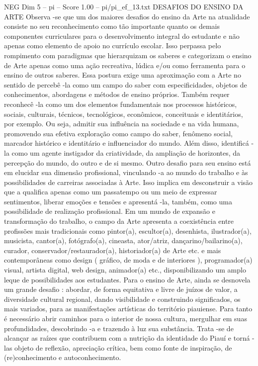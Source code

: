 \begin{textsample}{NEG Dim 5 – pi – Score 1.00 – pi/pi\_ef\_13.txt}  \label{ex:f5_neg_060}
DESAFIOS DO ENSINO DA ARTE Observa -se que um dos maiores desafios do ensino da Arte na atualidade consiste no seu reconhecimento como tão importante quanto os demais componentes curriculares para o desenvolvimento integral do estudante e não apenas como elemento de apoio no currículo escolar.
Isso perpassa pelo rompimento com paradigmas que hierarquizam os saberes e categorizam o ensino de Arte apenas como uma ação recreativa, lúdica e/ou como ferramenta para o ensino de outros saberes.
Essa postura exige uma aproximação com a Arte no sentido de percebê -la como um campo do saber com especificidades, objetos de conhecimentos, abordagens e métodos de ensino próprios.
Também requer reconhecê -la como um dos elementos fundamentais nos processos históricos, sociais, culturais, técnicos, tecnológicos, econômicos, conceituais e identitários, por exemplo.
Ou seja, admitir sua influência na sociedade e na vida humana, promovendo sua efetiva exploração como campo do saber, fenômeno social, marcador histórico e identitário e influenciador do mundo.
Além disso, identificá -la como um agente instigador da criatividade, da ampliação de horizontes, da percepção do mundo, do outro e de si mesmo.
Outro desafio para seu ensino está em elucidar sua dimensão profissional, vinculando -a ao mundo do trabalho e às possibilidades de carreiras associadas à Arte.
Isso implica em desconstruir a visão que a qualifica apenas como um passatempo ou um meio de expressar sentimentos, liberar emoções e tensões e apresentá -la, também, como uma possibilidade de realização profissional.
Em um mundo de expansão e transformação do trabalho, o campo da Arte apresenta a coexistência entre profissões mais tradicionais como pintor(a), escultor(a), desenhista, ilustrador(a), musicista, cantor(a), fotógrafo(a), cineasta, ator/atriz, dançarino/bailarino(a), curador, conservador/restaurador(a), historiador(a) de Arte etc. e mais contemporâneas como design ( gráfico, de moda e de interiores ), programador(a) visual, artista digital, web design, animador(a) etc., disponibilizando um amplo leque de possibilidades aos estudantes.
Para o ensino de Arte, ainda se desnovela um grande desafio : abordar, de forma equitativa e livre de juízos de valor, a diversidade cultural regional, dando visibilidade e construindo significados, os mais variados, para as manifestações artísticas do território piauiense.
Para tanto é necessário abrir caminhos para o interior de nossa cultura, mergulhar em suas profundidades, descobrindo -a e trazendo à luz sua substância.
Trata -se de alcançar as raízes que contribuem com a nutrição da identidade do Piauí e torná -las objeto de reflexão, apreciação crítica, bem como fonte de inspiração, de (re)conhecimento e autoconhecimento.

\end{textsample}
